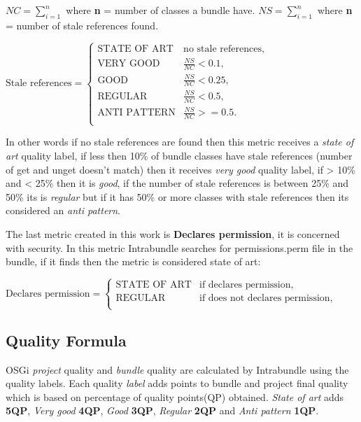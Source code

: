 \(NC = \sum_{i=1}^{n} \) where \textbf{n} = number of classes a bundle have. \newline
\(NS = \sum_{i=1}^{n} \) where \textbf{n} = number of stale references found. \newline

\(\text{Stale references}=\begin{cases}
\text{STATE OF ART}& \text{no stale references},\\
\text{VERY GOOD}& \frac{NS}{NC} < 0.1, \\
\text{GOOD}& \frac{NS}{NC} < 0.25, \\
\text{REGULAR}& \frac{NS}{NC} < 0.5, \\
\text{ANTI PATTERN}& \frac{NS}{NC} >= 0.5. \\
\end{cases} \)\newline     

In other words if no stale references are found then this metric receives a \emph{state of art} quality label, if less then 10\% of bundle classes have stale references (number of get and unget doesn't match) then it receives \emph{very good} quality label, if > 10\% and < 25\% then it is \emph{good}, if the number of stale references is between 25\% and 50\% its is \emph{regular} but if it has 50\% or more classes with stale references then its considered an \emph{anti pattern}. 

The last metric created in this work is \textbf{Declares permission}, it is concerned with security. In this metric Intrabundle searches for permissions.perm file in the bundle, if it finds then the metric is considered state of art: \newline


\(\text{Declares permission}=\begin{cases}
\text{STATE OF ART}& \text{if declares permission},\\
\text{REGULAR}& \text{if does not declares permission}, \\
\end{cases} \)  \newline

\subsection{Quality Formula}

OSGi \emph{project} quality and \emph{bundle} quality are calculated by Intrabundle using the quality labels. Each quality \emph{label} adds points to bundle and project final quality which is based on percentage of quality points(QP) obtained. \emph{State of art} adds \textbf{5QP}, \emph{Very good} \textbf{4QP}, \emph{Good} \textbf{3QP}, \emph{Regular} \textbf{2QP} and \emph{Anti pattern} \textbf{1QP}. 

